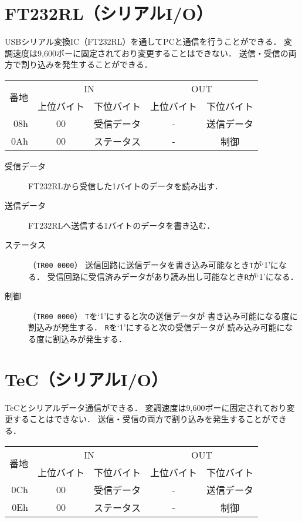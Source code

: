 \section{FT232RL（シリアルI/O）}
USBシリアル変換IC（FT232RL）を通してPCと通信を行うことができる．
変調速度は9,600ボーに固定されており変更することはできない．
送信・受信の両方で割り込みを発生することができる．

\begin{center}
  \small\begin{tabular}{| r | c | c || c | c |}\hline
    \multirow{2}{*}{番地}
    & \multicolumn{2}{c||}{IN}
    & \multicolumn{2}{c|}{OUT}
    \\\cline{2-5}
         & 上位バイト & 下位バイト & 上位バイト & 下位バイト
    \\\hline\hline
    08h  &  00 & 受信データ
         &  -  & 送信データ \\\hline
    0Ah  &  00 & ステータス
         &  -  & 制御 \\\hline
  \end{tabular}
\end{center}

\begin{description}
\item[受信データ]
  FT232RLから受信した1バイトのデータを読み出す．
\item[送信データ]
  FT232RLへ送信する1バイトのデータを書き込む．
\item[ステータス]（\texttt{TR00 0000}）
  送信回路に送信データを書き込み可能なとき\texttt{T}が`1'になる．
  受信回路に受信済みデータがあり読み出し可能なとき\texttt{R}が`1'になる．
\item[制御]（\texttt{TR00 0000}）
  \texttt{T}を`1'にすると次の送信データが
  書き込み可能になる度に割込みが発生する．
  \texttt{R}を`1'にすると次の受信データが
  読み込み可能になる度に割込みが発生する．
\end{description}

\section{TeC（シリアルI/O）}
TeCとシリアルデータ通信ができる．
変調速度は9,600ボーに固定されており変更することはできない．
送信・受信の両方で割り込みを発生することができる．

\begin{center}
  \small\begin{tabular}{| r | c | c || c | c |}\hline
    \multirow{2}{*}{番地}
    & \multicolumn{2}{c||}{IN}
    & \multicolumn{2}{c|}{OUT}
    \\\cline{2-5}
         & 上位バイト & 下位バイト & 上位バイト & 下位バイト
    \\\hline\hline
    0Ch  &  00 & 受信データ
         &  -  & 送信データ \\\hline
    0Eh  &  00 & ステータス
         &  -  & 制御 \\\hline
  \end{tabular}
\end{center}

